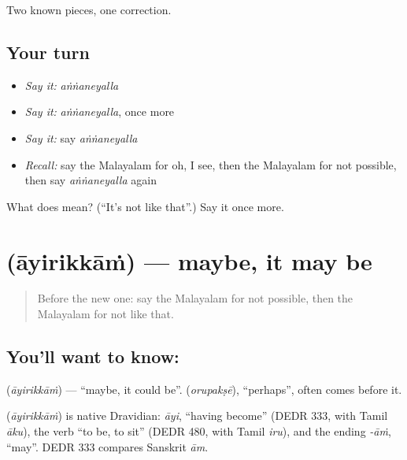 \begin{grammarlens}[title={What you've built}]
Two known pieces, one correction.
\end{grammarlens}

\subsection*{Your turn}
\begin{itemize}
\raggedright
  \item \emph{Say it:} \emph{aṅṅaneyalla}
  \item \emph{Say it:} \emph{aṅṅaneyalla}, once more
  \item \emph{Say it:} say \emph{aṅṅaneyalla}
  \item \emph{Recall:} say the Malayalam for oh, I see, then the Malayalam for not possible, then say \emph{aṅṅaneyalla} again
\end{itemize}

\begin{tcolorbox}[breakable,colback=teal!4,colframe=teal!35!black,title={Before you move on}]
What does  mean? (\textquotedblleft{}It's not like that\textquotedblright{}.) Say it once more.
\end{tcolorbox}
\section[\texorpdfstring{\ml{ആയിരിക്കാം} (āyirikkāṁ)}{ആയിരിക്കാം (āyirikkāṁ)}]{ (āyirikkāṁ) — maybe, it may be}

\label{lesson:ML-C123-maybe}



\begin{quote}
Before the new one: say the Malayalam for not possible, then the Malayalam for not like that.
\end{quote}

\subsection*{You'll want to know: }
\textbf{} (\emph{āyirikkāṁ}) — \textquotedblleft{}maybe, it could be\textquotedblright{}. \textbf{} (\emph{orupakṣē}), \textquotedblleft{}perhaps\textquotedblright{}, often comes before it.

\begin{cousinweb}
\textbf{} (\emph{āyirikkāṁ}) is native Dravidian: \emph{āyi}, \textquotedblleft{}having become\textquotedblright{} (DEDR 333, with Tamil \emph{āku}), the verb \textquotedblleft{}to be, to sit\textquotedblright{} (DEDR 480, with Tamil \emph{iru}), and the ending \emph{-āṁ}, \textquotedblleft{}may\textquotedblright{}. DEDR 333 compares Sanskrit \emph{ām}.
\end{cousinweb}

